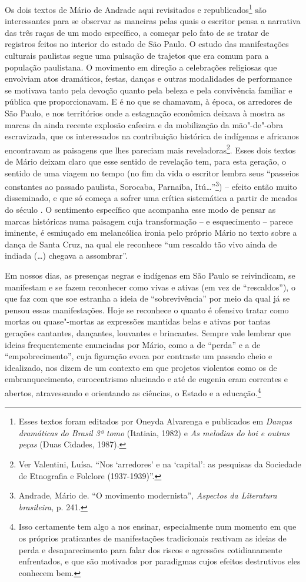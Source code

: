 Os dois textos de Mário de Andrade aqui revisitados e
republicados\footnote{Esses textos foram editados por Oneyda Alvarenga e
  publicados em \emph{Danças dramáticas do Brasil 3º tomo} (Itatiaia,
  1982) e \emph{As melodias do boi e outras peças} (Duas Cidades, 1987).}
são interessantes para se observar as maneiras pelas quais o escritor
pensa a narrativa das três raças de um modo específico, a começar pelo
fato de se tratar de registros feitos no interior do estado de São
Paulo. O estudo das manifestações culturais paulistas segue uma pulsação
de trajetos que era comum para a população paulistana. O movimento em
direção a celebrações religiosas que envolviam atos dramáticos, festas,
danças e outras modalidades de performance se motivava tanto pela
devoção quanto pela beleza e pela convivência familiar e pública que
proporcionavam. E é no que se chamavam, à época, os arredores de São
Paulo, e nos territórios onde a estagnação econômica deixava à mostra as
marcas da ainda recente explosão cafeeira e da mobilização da
mão"-de"-obra escravizada, que os interessados na contribuição histórica
de indígenas e africanos encontravam as paisagens que lhes pareciam mais
reveladoras\footnote{Ver Valentini, Luísa. ``Nos `arredores' e na
  `capital': as pesquisas da Sociedade de Etnografia e Folclore
  (1937-1939)''.}. Esses dois textos de Mário deixam claro que esse
sentido de revelação tem, para esta geração, o sentido de uma viagem no
tempo (no fim da vida o escritor lembra seus ``passeios constantes ao
passado paulista, Sorocaba, Parnaíba, Itú\ldots{}''\footnote{Andrade, Mário
  de. ``O movimento modernista'', \emph{Aspectos da Literatura
  brasileira}, p. 241.}) -- efeito então muito disseminado, e que só
começa a sofrer uma crítica sistemática a partir de meados do século .
O sentimento específico que acompanha esse modo de pensar as marcas
históricas numa paisagem cuja transformação -- e esquecimento -- parece
iminente, é esmiuçado em melancólica ironia pelo próprio Mário no texto
sobre a dança de Santa Cruz, na qual ele reconhece ``um rescaldo tão
vivo ainda de indiada (\ldots{}) chegava a assombrar''.

Em nossos dias, as presenças negras e indígenas em São Paulo se
reivindicam, se manifestam e se fazem reconhecer como vivas e ativas (em
vez de ``rescaldos''), o que faz com que soe estranha a ideia de
``sobrevivência'' por meio da qual já se pensou essas manifestações.
Hoje se reconhece o quanto é ofensivo tratar como mortas ou quase"-mortas
as expressões mantidas belas e ativas por tantas gerações cantantes,
dançantes, louvantes e brincantes. Sempre vale lembrar que ideias
frequentemente enunciadas por Mário, como a de ``perda'' e a de
``empobrecimento'', cuja figuração evoca por contraste um passado cheio
e idealizado, nos dizem de um contexto em que projetos violentos como os
de embranquecimento, eurocentrismo alucinado e até de eugenia eram
correntes e abertos, atravessando e orientando as ciências, o Estado e a
educação.\footnote{Isso certamente tem algo a nos ensinar, especialmente
  num momento em que os próprios praticantes de manifestações
  tradicionais reativam as ideias de perda e desaparecimento para falar
  dos riscos e agressões cotidianamente enfrentados, e que são motivados
  por paradigmas cujos efeitos destrutivos eles conhecem bem.}

